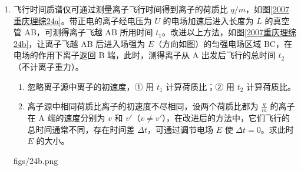 \documentclass[\gkver]{gaokaozhenti}
\begin{document}
\begin{enumerate}
（2）该运动的磁场可视为沿 $x$ 轴传播的波，设垂直于纸面向外的磁场方向为正，画出 $t=0$ 时磁感应强度的波形图，并求波长 $\lambda$ 和频率 $f$。




\item
飞行时间质谱仪可通过测量离子飞行时间得到离子的荷质比 $q/m$，如图\ref{2007重庆理综24a}。带正电的离子经电压为 $U$ 的电场加速后进入长度为 $L$ 的真空管 AB，可测得离子飞越 AB 所用时间 $t_{1}$。改进以上方法，如图\ref{2007重庆理综24b}，让离子飞越 AB 后进入场强为 $E$（方向如图）的匀强电场区域 BC，在电场的作用下离子返回 B 端，此时，测得离子从 A 出发后飞行的总时间 $t_{2}$（不计离子重力）。

\begin{enumerate}
	\item
	忽略离子源中离子的初速度，① 用 $t_{1}$ 计算荷质比；② 用 $t_{2}$ 计算荷质比。
	\item
	离子源中相同荷质比离子的初速度不尽相同，设两个荷质比都为 $\frac{q}{m}$ 的离子在 A 端的速度分别为 $v$ 和 $v'$（$v\neq v'$），在改进后的方法中，它们飞行的总时间通常不同，存在时间差 $\Delta t$，可通过调节电场 $E$ 使 $\Delta t=0$。求此时 $E$ 的大小。
\end{enumerate}

{figs/24b.png}


\end{enumerate}
\end{document}
